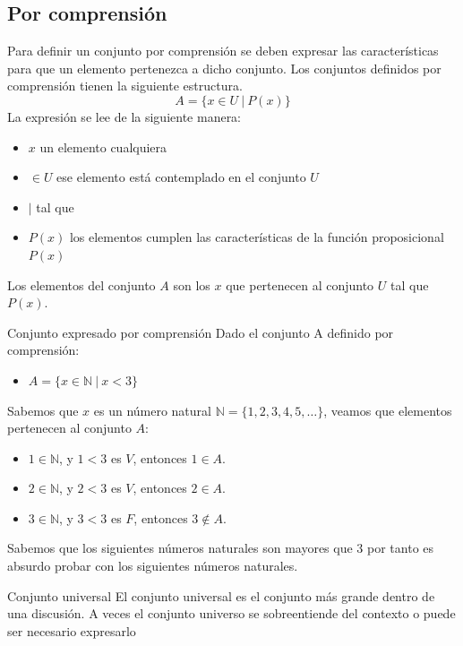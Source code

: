 \subsection{Por comprensión}
Para definir un conjunto por comprensión se deben expresar las características para que un elemento pertenezca a dicho conjunto. Los conjuntos definidos por comprensión tienen la siguiente estructura.
\begin{equation}
A = \{ x \in U \ | \ P(x)\}
\end{equation}
La expresión se lee de la siguiente manera:
\begin{itemize}
	\item $x$ un elemento cualquiera
	\item $\in U$ ese elemento está contemplado en el conjunto $U$
	\item $|$ tal que
	\item $P(x)$ los elementos cumplen las características de la función proposicional $P(x)$
\end{itemize}
Los elementos del conjunto $A$ son los $x$ que pertenecen al conjunto $U$ tal que $P(x)$.

\begin{ejem}{Conjunto expresado por comprensión}
	Dado el conjunto A definido por comprensión:
\begin{itemize}
	\item $A = \{x \in \mathbb{N} \ | \ x < 3 \}$
\end{itemize}
Sabemos que $x$ es un número natural $\mathbb{N}= \{1,2,3,4,5,\dots\}$, veamos que elementos pertenecen al conjunto $A$:
\begin{itemize}
	\item $1 \in \mathbb{N}$, y $1<3$ es $V$, entonces $1 \in A$.
	\item $2 \in \mathbb{N}$, y $2<3$ es $V$, entonces $2 \in A$.
	\item $3 \in \mathbb{N}$, y $3<3$ es $F$, entonces $3 \notin A$.
\end{itemize}
Sabemos que los siguientes números naturales son mayores que $3$ por tanto es absurdo probar con los siguientes números naturales.
\end{ejem}

\begin{dfn}{Conjunto universal}
El conjunto universal es el conjunto más grande dentro de una discusión. A veces el conjunto universo se sobreentiende del contexto o puede ser necesario expresarlo 


\end{dfn}

